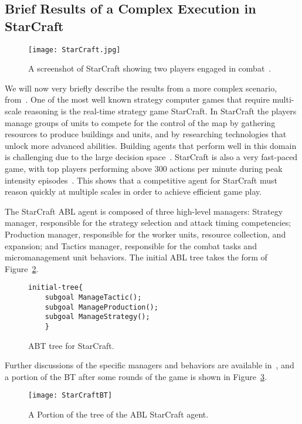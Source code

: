 \clearpage
\subsection{Brief Results of a Complex Execution in StarCraft}

\begin{figure}[h]
\centering
\texttt{[image: StarCraft.jpg]}
\caption{A screenshot of StarCraft showing two players engaged in combat~\cite{weber2011building}.}
\label{planning:abl.fig.starcraft}
\end{figure}

We will now very briefly describe the results from a more complex scenario, from~\cite{weber2011building}.
One of the most well known strategy computer games that require
multi-scale reasoning is the real-time strategy game StarCraft. In StarCraft the players manage groups of units to compete for the control of the map by gathering resources
to produce buildings and units, and by researching
technologies that unlock more advanced abilities.
Building agents that perform well in this domain is challenging
due to the large decision space~\cite{aha2005learning}. StarCraft
is also a very fast-paced game, with top players performing above
300 actions per minute during peak intensity episodes~\cite{mccoy2008integrated}. This shows
that a competitive agent for StarCraft must reason quickly
at multiple scales in order to achieve efficient
game play.


\begin{example}
\label{planning:abl.ex.starcraft}

The StarCraft ABL agent is composed of three high-level managers: Strategy manager, responsible for the strategy selection and attack timing competencies; Production manager, responsible for the worker units, resource collection,
and expansion; and Tactics manager, responsible for the combat tasks and micromanagement
unit behaviors. The initial ABL tree takes the form of Figure~\ref{planning:abl.fig.starcrafttree}.


\begin{figure}[h]
\centering
\begin{lstlisting}
initial-tree{
	subgoal ManageTactic();
	subgoal ManageProduction();
	subgoal ManageStrategy();
	}
\end{lstlisting}
\caption{ABT tree for StarCraft.}
\label{planning:abl.fig.starcrafttree}
\end{figure}
Further discussions of the specific managers and behaviors  are available in~\cite{weber2011building}, and  a portion of the BT after some rounds of the game is shown in Figure~\ref{planning:abl.fig.starcraftbt}. 


\begin{figure}[h]
\centering
\texttt{[image: StarCraftBT]}
\caption{A Portion of the tree of the ABL StarCraft agent.}
\label{planning:abl.fig.starcraftbt}
\end{figure}

\end{example}


